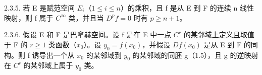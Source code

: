 2.3.5. 若 E 是赋范空间 \(E_{i}\)（\(1 \leqslant i \leqslant n\)）的乘积，且 f 是从 E 到 F 的连续 n 线性映射，则 f 属于 \(C^{\infty}\) 类，并且当 \(D^{p}f = 0\) 时有 \(p \geqslant n + 1\)。

2.3.6. 假设 E 和 F 是巴拿赫空间。设 f 是在 E 中一点 \(C^{r}\) 的某邻域上定义且取值于 F 的 \(r \geqslant 1\) 类函数（\(x_{0}\)）。设 \(y_{0} = f(x_{0})\)，并假设 \(Df(x_{0})\) 是从 E 到 F 的同构。则 f 诱导出一个从 \(x_{0}\) 的某邻域到 \(y_{0}\) 的某邻域的同胚 g（1.5），且 g 的逆映射在 \(C^{r}\) 的某邻域上属于 \(y_{0}\) 类。

